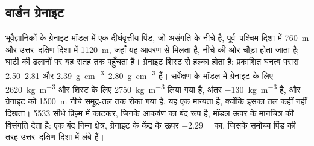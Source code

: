 \begin{omfigure}
\par{}\label{fig:b3:field-lab-methods-3:survey}
\end{omfigure}

\subsection{वार्डन ग्रेनाइट}

भूवैज्ञानिकों के ग्रेनाइट मॉडल में एक दीर्घवृत्तीय पिंड,
जो असंगति के नीचे है, पूर्व--पश्चिम दिशा में \qty{760}{m} और
उत्तर--दक्षिण दिशा में \qty{1120}{m}, जहाँ यह आवरण से मिलता है, नीचे की ओर चौड़ा होता जाता है; घाटी की
ढलानों पर यह सतह तक पहुँचता है। ग्रेनाइट शिस्ट से हल्का होता है:
प्रकाशित घनत्व परास \numrange{2.50}{2.81} और
\qtyrange{2.39}{2.80}{g.cm^{-3}} हैं। सर्वेक्षण के मॉडल में
ग्रेनाइट के लिए \qty{2620}{kg.m^{-3}} और शिस्ट के लिए
\qty{2750}{kg.m^{-3}} लिया गया है, अंतर \qty{-130}{kg.m^{-3}} है, और ग्रेनाइट को
\qty{1500}{m} नीचे समुद्र-तल तक रोका गया है, यह एक मान्यता है, क्योंकि इसका
तल कहीं नहीं दिखता। \num{5533} सीधे प्रिज़्म में काटकर, जिनके आकर्षण का बंद रूप है,
मॉडल ऊपर के मानचित्र की विसंगति देता है: एक बंद निम्न क्षेत्र,
ग्रेनाइट के केंद्र के ऊपर \qty{-2.29}{\milli\gal} का, जिसके समोच्च
पिंड की तरह उत्तर--दक्षिण दिशा में लंबे हैं।

